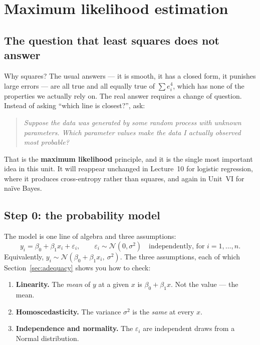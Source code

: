 \documentclass[11pt]{article}
\begin{document}
\section{Maximum likelihood estimation}
\label{sec:mle}

\subsection{The question that least squares does not answer}

Why squares? The usual answers --- it is smooth, it has a closed form, it
punishes large errors --- are all true and all equally true of $\sum e_i^4$,
which has none of the properties we actually rely on. The real answer requires
a change of question. Instead of asking ``which line is closest?'', ask:

\begin{quote}
\emph{Suppose the data was generated by some random process with unknown
parameters. Which parameter values make the data I actually observed most
probable?}
\end{quote}

That is the \textbf{maximum likelihood} principle, and it is the single most
important idea in this unit. It will reappear unchanged in Lecture~10 for
logistic regression, where it produces cross-entropy rather than squares,
and again in Unit~VI for na\"ive Bayes.

\subsection{Step 0: the probability model}
\label{sec:model}

The model is one line of algebra and three assumptions:
\[
  y_i = \beta_0 + \beta_1 x_i + \varepsilon_i,
  \qquad
  \varepsilon_i \sim \mathcal{N}(0, \sigma^2)
  \quad\text{independently, for } i = 1,\dots,n .
\]
Equivalently, $y_i \sim \mathcal{N}(\beta_0 + \beta_1 x_i,\ \sigma^2)$. The
three assumptions, each of which Section~\ref{sec:adequacy} shows you how to
check:

\begin{enumerate}[leftmargin=*]
  \item \textbf{Linearity.} The \emph{mean} of $y$ at a given $x$ is
    $\beta_0 + \beta_1 x$. Not the value --- the mean.
  \item \textbf{Homoscedasticity.} The variance $\sigma^2$ is the
    \emph{same} at every $x$.
  \item \textbf{Independence and normality.} The $\varepsilon_i$ are
    independent draws from a Normal distribution.
\end{enumerate}
\end{document}
